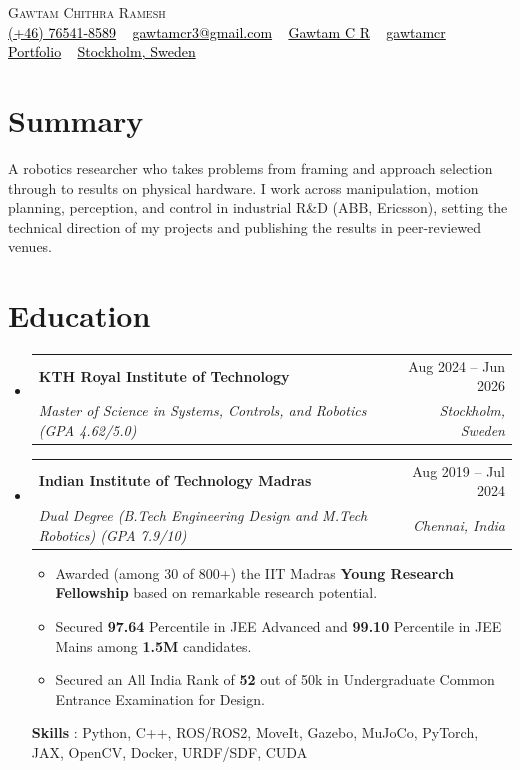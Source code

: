 \documentclass[letterpaper, 11pt]{article}
\makeatletter
\newcommand{\vTableRowSep}{-2pt}   %
\newcommand{\vItemTop}{-3pt}       %
\newcommand{\vSubheadingEnd}{-12pt}%
\newcommand{\vListStart}{0em}   %
\newcommand{\vListGroupEnd}{-1.5em}  %
\newcommand{\vHeadingName}{3pt}    %
\newcommand{\vHeadingEnd}{-8pt}    %
\newcommand{\vSummaryTop}{2pt}     %
\newcommand{\vSummaryEnd}{-6pt}    %
\newcommand{\vEduSep}{5pt}         %
\newcommand{\vEduItemSep}{-0.3em}  %
\newcommand{\vEduSkills}{-0.7em}   %
\newcommand{\resumeSubheading}[4]{
\vspace{\vItemTop}
\item
\begin{tabular*}{1.0\textwidth}[t]{l@{\extracolsep{\fill}}r}
	\textbf{#1}       & {\small #2} \\
     [\vTableRowSep]
	\textit{{\small#3}} & \textit{\small #4} \\
\end{tabular*}
\vspace{\vSubheadingEnd}
}
\newcommand{\resumeSubHeadingListStart}{\begin{itemize}[leftmargin=0.0in, label={}]}
\newcommand{\resumeSubHeadingListEnd}{\end{itemize}\vspace{\vListGroupEnd}}
\makeatother
\begin{document}
\begin{center}
    {\Huge \scshape Gawtam Chithra Ramesh} \\
    \vspace{\vHeadingName}
    \small
    { \href{tel:+46764518589}{{\faMobile*} \textcolor{black}{(+46) 76541-8589}} ~
    \href{mailto:gawtamcr3@gmail.com}{{\faPaperPlane} \textcolor{black}{gawtamcr3@gmail.com}} ~
    \href{https://linkedin.com/in/gawtamcr/}{{\faLinkedinIn} \textcolor{black}{Gawtam C R}} ~
    \href{https://github.com/gawtamcr}{{\faGithub} \textcolor{black}{gawtamcr}} ~
    \href{https://gawtamcr.github.io/}{{\faGlobe} \textcolor{black}{Portfolio}} ~
    \href{https://maps.google.com/?q=Stockholm,Sweden}{{\faMapMarker*} \textcolor{black}{Stockholm, Sweden}}
    }
    \vspace{\vHeadingEnd}
\end{center}

\section{\color{Blue}Summary}
\vspace{\vSummaryTop}
\small{A robotics researcher who takes problems from framing and approach selection through to results on physical hardware. I work across manipulation, motion planning, perception, and control in industrial R\&D (ABB, Ericsson), setting the technical direction of my projects and publishing the results in peer-reviewed venues.}
\vspace{\vSummaryEnd}

\section{\color{Blue}Education}
    \resumeSubHeadingListStart
    \resumeSubheading{KTH Royal Institute of Technology}{Aug 2024 -- Jun 2026}{Master of Science in Systems, Controls, and Robotics \textnormal{(GPA 4.62/5.0)}}{Stockholm, Sweden}
    \vspace{\vEduSep}
    \resumeSubheading{Indian Institute of Technology Madras}{Aug 2019 -- Jul 2024}{Dual Degree (B.Tech Engineering Design and M.Tech Robotics) \textnormal{(GPA 7.9/10)}}{Chennai, India}
    \vspace{\vListStart}
    \small{
    \begin{itemize}[leftmargin=0.15in]
        \setlength{\itemsep}{\vEduItemSep}
        \item Awarded (among 30 of 800+) the IIT Madras \textbf{Young Research Fellowship} based on remarkable research potential.
        \item Secured \textbf{97.64} Percentile in JEE Advanced and \textbf{99.10} Percentile in JEE Mains among \textbf{1.5M} candidates.
        \item Secured an All India Rank of \textbf{52} out of 50k in Undergraduate Common Entrance Examination for Design.
    \end{itemize}
    }
    \vspace{\vEduSkills}
    \textbf{Skills} : Python, C++, ROS/ROS2, MoveIt, Gazebo, MuJoCo, PyTorch, JAX, OpenCV, Docker, URDF/SDF, CUDA
    \resumeSubHeadingListEnd
\end{document}
